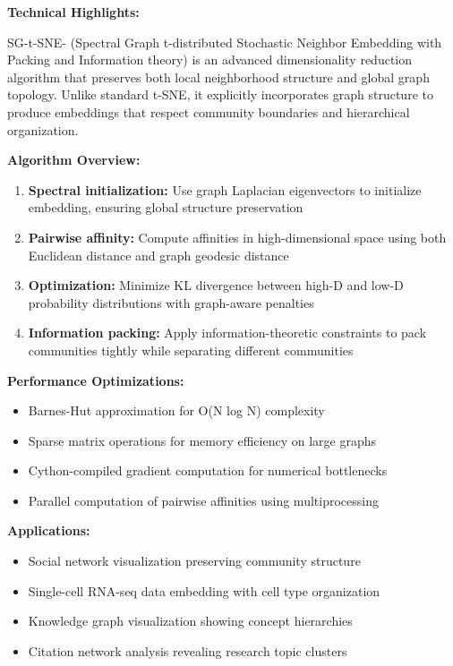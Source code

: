 \vspace{1em}

\textbf{Technical Highlights:}

SG-t-SNE-\textPi{} (Spectral Graph t-distributed Stochastic Neighbor Embedding with Packing and Information theory) is an advanced dimensionality reduction algorithm that preserves both local neighborhood structure and global graph topology. Unlike standard t-SNE, it explicitly incorporates graph structure to produce embeddings that respect community boundaries and hierarchical organization.

\textbf{Algorithm Overview:}
\begin{enumerate}[leftmargin=1.2em, itemsep=0.1em]
  \item \textbf{Spectral initialization:} Use graph Laplacian eigenvectors to initialize embedding, ensuring global structure preservation
  \item \textbf{Pairwise affinity:} Compute affinities in high-dimensional space using both Euclidean distance and graph geodesic distance
  \item \textbf{Optimization:} Minimize KL divergence between high-D and low-D probability distributions with graph-aware penalties
  \item \textbf{Information packing:} Apply information-theoretic constraints to pack communities tightly while separating different communities
\end{enumerate}

\textbf{Performance Optimizations:}
\begin{itemize}[leftmargin=1.2em, itemsep=0.1em]
  \item Barnes-Hut approximation for O(N log N) complexity
  \item Sparse matrix operations for memory efficiency on large graphs
  \item Cython-compiled gradient computation for numerical bottlenecks
  \item Parallel computation of pairwise affinities using multiprocessing
\end{itemize}

\textbf{Applications:}
\begin{itemize}[leftmargin=1.2em, itemsep=0.1em]
  \item Social network visualization preserving community structure
  \item Single-cell RNA-seq data embedding with cell type organization
  \item Knowledge graph visualization showing concept hierarchies
  \item Citation network analysis revealing research topic clusters
\end{itemize}

